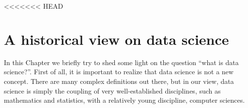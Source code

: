 \documentclass[10pt]{PhDthesisPSnPDF}%
\begin{document}
\setcounter{secnumdepth}{3} %
\setcounter{tocdepth}{2}    %
\tableofcontents            %


	


\cleardoublepage
\newpage
{}	 %

<<<<<<< HEAD
\chapter{A historical view on data science}\label{DS} 

In this Chapter we briefly try to shed some light on the question ``what is data science?''. First of all, it is important to realize that data science is not a new concept. There are many complex definitions out there, but in our view, data science is simply the coupling of very well-established disciplines, such as mathematics and statistics, with a relatively young discipline, computer sciences. 
\end{document}
